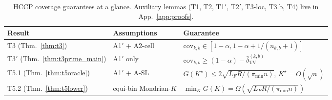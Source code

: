 \begin{table}[h]
\centering
\small
\caption{HCCP coverage guarantees at a glance. Auxiliary lemmas (T1, T2, T1$'$, T2$'$, T3-loc, T3.b, T4) live in App.~\ref{app:proofs}.}
\setlength{\tabcolsep}{4pt}
\begin{tabular}{lll}
\toprule
Result & Assumptions & Guarantee \\
\midrule
T3 (Thm.~\ref{thm:t3}) & A1$'$ + A2-cell & $\mathrm{cov}_{k,b} \in [1-\alpha, 1-\alpha + 1/(n_{k,b}+1)]$ \\
T3$'$ (Thm.~\ref{thm:t3prime_main}) & A1$'$ only & $\mathrm{cov}_{k,b} \geq (1-\alpha) - \bar\delta_{\mathrm{TV}}^{(k,b)}$ \\
T5.1 (Thm.~\ref{thm:t5oracle}) & A1$'$ + A-SL & $G(K^\star) \leq 2\sqrt{L_F R / (\pi_{\min} n)}$, $K^\star = O(\sqrt{n})$ \\
T5.2 (Thm.~\ref{thm:t5lower}) & equi-bin Mondrian-$K$ & $\min_K G(K) = \Omega(\sqrt{L_F R / (\pi_{\min} n)})$ \\
\bottomrule
\end{tabular}
\end{table}
